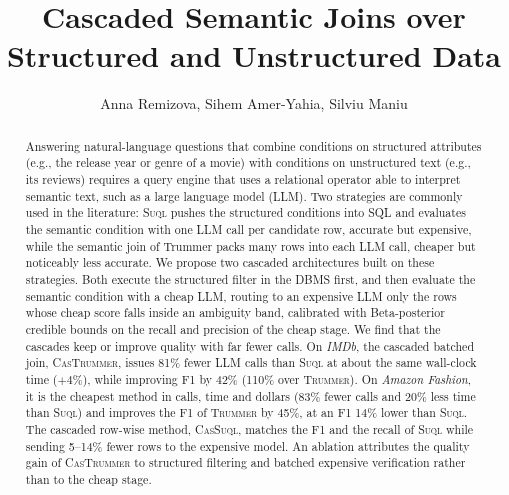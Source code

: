 \documentclass[sigconf]{acmart}
\begin{document}
\title{Cascaded Semantic Joins over Structured and Unstructured Data}

\author{Anna Remizova, Sihem Amer-Yahia, Silviu Maniu}


\begin{abstract}
Answering natural-language questions that combine conditions on structured attributes (e.g., the release year or genre of a movie) with conditions on unstructured text (e.g., its reviews) requires a query engine that uses a relational operator able to interpret semantic text, such as a large language model (LLM). Two strategies are commonly used in the literature: \textsc{Suql} pushes the structured conditions into SQL and evaluates the semantic condition with one LLM call per candidate row, accurate but expensive, while the semantic join of Trummer packs many rows into each LLM call, cheaper but noticeably less accurate. We propose two cascaded architectures built on these strategies. Both execute the structured filter in the DBMS first, and then evaluate the semantic condition with a cheap LLM, routing to an expensive LLM only the rows whose cheap score falls inside an ambiguity band, calibrated with Beta-posterior credible bounds on the recall and precision of the cheap stage. We find that the cascades keep or improve quality with far fewer calls. On \textit{IMDb}, the cascaded batched join, \textsc{CasTrummer}, issues 81\% fewer LLM calls than \textsc{Suql} at about the same wall-clock time ($+4\%$), while improving F1 by 42\% (110\% over \textsc{Trummer}). On \textit{Amazon Fashion}, it is the cheapest method in calls, time and dollars (83\% fewer calls and 20\% less time than \textsc{Suql}) and improves the F1 of \textsc{Trummer} by 45\%, at an F1 14\% lower than \textsc{Suql}. The cascaded row-wise method, \textsc{CasSuql}, matches the F1 and the recall of \textsc{Suql} while sending 5--14\% fewer rows to the expensive model. An ablation attributes the quality gain of \textsc{CasTrummer} to structured filtering and batched expensive verification rather than to the cheap stage.
\end{abstract}


\maketitle
\thispagestyle{firstpagestyle}
\end{document}

